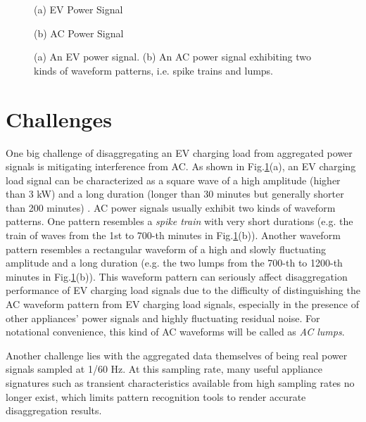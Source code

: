 \documentclass[conference]{IEEEtran}
\begin{document}
\begin{figure}[t]
\begin{minipage}[b]{.48\linewidth}
  \centering
  \centerline{}
  \centerline{\footnotesize{(a) EV Power Signal}}
\end{minipage}
\hfill
\begin{minipage}[b]{0.48\linewidth}
  \centering
  \centerline{}
  \centerline{\footnotesize{(b) AC Power Signal}}
\end{minipage}
\caption{(a) An EV power signal. (b) An AC power signal exhibiting two kinds of waveform patterns, i.e. spike trains and lumps.}
\label{fig:ACnEV}
\end{figure}


\section{Challenges}
\label{sec:AC}

One big challenge of disaggregating an EV charging load from aggregated power signals is mitigating  interference  from AC. As shown in Fig.\ref{fig:ACnEV}(a), an EV charging load signal can be characterized as a square wave of a high amplitude (higher than 3 kW) and a long duration (longer than 30 minutes but generally shorter than 200 minutes) \cite{PecanReportEV}. AC power signals usually exhibit two kinds of waveform patterns. One pattern resembles a \emph{spike train} with very short durations (e.g. the train of waves from the 1st to 700-th minutes in Fig.\ref{fig:ACnEV}(b)). Another waveform pattern resembles a rectangular waveform of a high and slowly fluctuating amplitude and a long duration (e.g. the two lumps from the 700-th to 1200-th minutes in Fig.\ref{fig:ACnEV}(b)). This waveform pattern can seriously affect disaggregation performance of EV charging load signals due to the difficulty of distinguishing the AC waveform pattern from EV charging load signals, especially in the presence of other appliances' power signals and highly fluctuating residual noise. For notational convenience, this kind of AC waveforms will be called as  \emph{AC lumps}.

Another challenge lies with the aggregated data themselves of being real power signals sampled at 1/60 Hz. At this sampling rate, many useful appliance signatures \cite{laughman2003power,liang2010load,xia2012adaptive} such as transient characteristics available from high sampling rates no longer exist, which limits pattern recognition tools to render accurate  disaggregation results.
\end{document}

